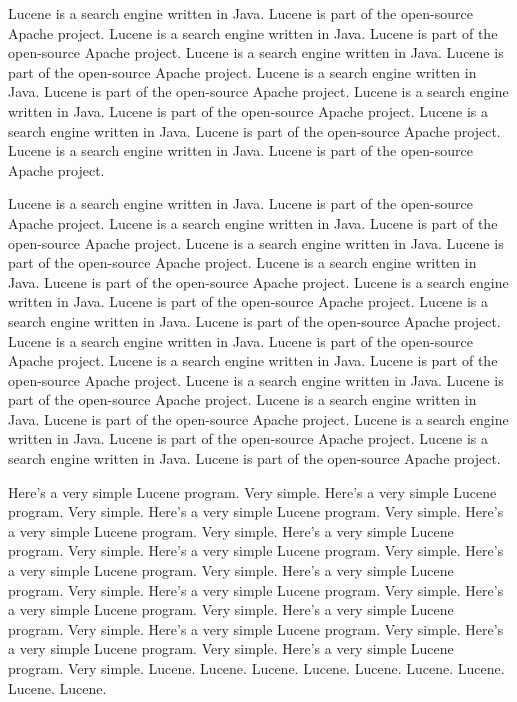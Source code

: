 \documentclass[11pt]{book}
\begin{document}
Lucene is a search engine written in Java.  Lucene is part of the
open-source Apache project.
Lucene is a search engine written in Java.  Lucene is part of the
open-source Apache project.
Lucene is a search engine written in Java.  Lucene is part of the
open-source Apache project.
Lucene is a search engine written in Java.  Lucene is part of the
open-source Apache project.
Lucene is a search engine written in Java.  Lucene is part of the
open-source Apache project.
Lucene is a search engine written in Java.  Lucene is part of the
open-source Apache project.
Lucene is a search engine written in Java.  Lucene is part of the
open-source Apache project.

Lucene is a search engine written in Java.  Lucene is part of the
open-source Apache project.
Lucene is a search engine written in Java.  Lucene is part of the
open-source Apache project.
Lucene is a search engine written in Java.  Lucene is part of the
open-source Apache project.
Lucene is a search engine written in Java.  Lucene is part of the
open-source Apache project.
Lucene is a search engine written in Java.  Lucene is part of the
open-source Apache project.
Lucene is a search engine written in Java.  Lucene is part of the
open-source Apache project.
Lucene is a search engine written in Java.  Lucene is part of the
open-source Apache project.
Lucene is a search engine written in Java.  Lucene is part of the
open-source Apache project.
Lucene is a search engine written in Java.  Lucene is part of the
open-source Apache project.
Lucene is a search engine written in Java.  Lucene is part of the
open-source Apache project.
Lucene is a search engine written in Java.  Lucene is part of the
open-source Apache project.
Lucene is a search engine written in Java.  Lucene is part of the
open-source Apache project.
%


\noindent
Here's a very simple Lucene program.  Very simple.
Here's a very simple Lucene program.  Very simple.
Here's a very simple Lucene program.  Very simple.
Here's a very simple Lucene program.  Very simple.
Here's a very simple Lucene program.  Very simple.
Here's a very simple Lucene program.  Very simple.
Here's a very simple Lucene program.  Very simple.
Here's a very simple Lucene program.  Very simple.
Here's a very simple Lucene program.  Very simple.
Here's a very simple Lucene program.  Very simple.
Here's a very simple Lucene program.  Very simple.
Here's a very simple Lucene program.  Very simple.
Here's a very simple Lucene program.  Very simple.
Here's a very simple Lucene program.  Very simple.
Lucene.
Lucene.
Lucene.
Lucene.
Lucene.
Lucene.
Lucene.
Lucene.
Lucene.
\end{document}
